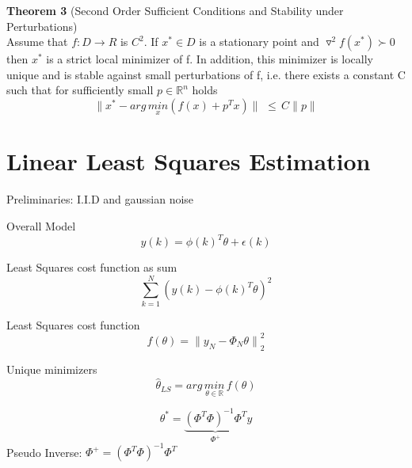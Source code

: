 \textbf{Theorem 3} (Second Order Sufficient Conditions and Stability under Perturbations)\\
Assume that $f : D \rightarrow R$ is $C^2.$ If $x^* \in D$ is a stationary point and
$ \triangledown^2 f(x^*) \succ 0$
then $x^*$ is a strict local minimizer of f. In addition, this minimizer is locally unique and is stable against small perturbations of f, i.e. there exists a constant C such that for sufficiently small $p \in \mathbb{R}^n$ holds\\
\begin{equation*}
\parallel{x^* - arg\, \underset{x}{min}  (f(x) + p^T x)}\parallel \,\, \leq \, C\parallel{p}\parallel
\end{equation*}



\section*{Linear Least Squares Estimation}
Preliminaries: I.I.D and gaussian noise

Overall Model
\begin{equation*}
y(k)={ \phi (k) }^{ T }\theta +\epsilon (k)
\end{equation*}

Least Squares cost function as sum
\begin{equation*}
\sum _{ k=1 }^{ N }{{ (y(k)-{ \phi (k) }^{ T }\theta )}^{2  } } 
\end{equation*}

Least Squares cost function
\begin{equation*}
f(\theta )={ \parallel {y  }_{N  }-{ \Phi }_{ N }\theta\parallel }_{ 2 }^{2  }
\end{equation*}

Unique minimizers
\begin{equation*}
\hat{\theta}_{LS} =arg \, \underset{ \theta \in \mathbb{R} }{ min } \, f(\theta)
\end{equation*}

\begin{equation*}
{ \theta  }^{ * }=\underbrace { { ({ \Phi  }^{ T }\Phi ) }^{ -1 }{ \Phi  }^{ T } }_{ { \Phi  }^{ + } } y
\end{equation*}
Pseudo Inverse: \qquad $\Phi ^{ + }={({ \Phi  }^{ T }\Phi ) }^{ -1 }{ \Phi  }^{ T }$\\


